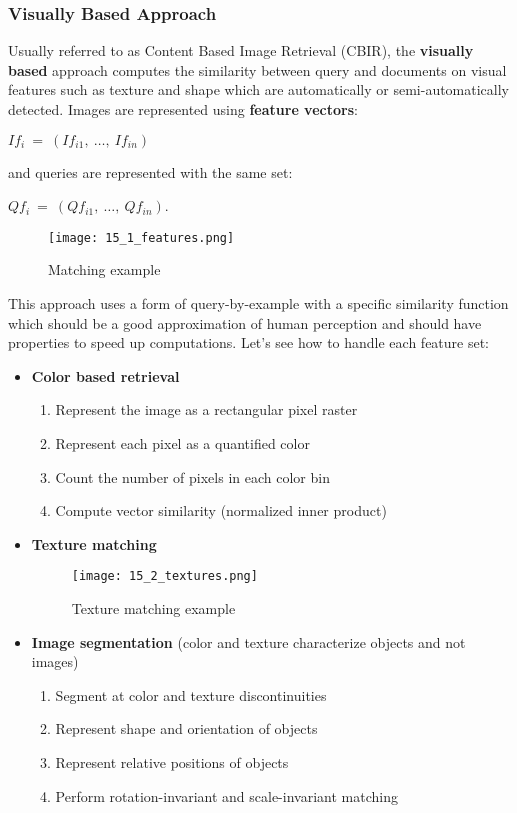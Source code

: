 \documentclass{article}
\begin{document}
\subsubsection{Visually Based Approach}
Usually referred to as Content Based Image Retrieval (CBIR), the \textbf{visually based} approach computes the similarity between query and documents on visual features such as texture and shape which are automatically or semi-automatically detected. Images are represented using \textbf{feature vectors}:
\begin{center}
    $If_i \ = \ (If_{i1}, \ \dots, \ If_{in})$
\end{center}
and queries are represented with the same set:
\begin{center}
    $Qf_i \ = \ (Qf_{i1}, \ \dots, \ Qf_{in})$.
\end{center}
\begin{figure}[H]
    \centering
    \texttt{[image: 15\_1\_features.png]}
    \caption{Matching example}
\end{figure}
This approach uses a form of query-by-example with a specific similarity function which should be a good approximation of human perception and should have properties to speed up computations.
Let's see how to handle each feature set:
\begin{itemize}
    \item \textbf{Color based retrieval}
        \begin{enumerate}
            \item Represent the image as a rectangular pixel raster
            \item Represent each pixel as a quantified color
            \item Count the number of pixels in each color bin
            \item Compute vector similarity (normalized inner product)
        \end{enumerate}
    \item \textbf{Texture matching}
        \begin{figure}[H]
            \centering
            \texttt{[image: 15\_2\_textures.png]}
            \caption{Texture matching example}
        \end{figure}
    \item \textbf{Image segmentation} (color and texture characterize objects and not images)
        \begin{enumerate}
            \item Segment at color and texture discontinuities
            \item Represent shape and orientation of objects
            \item Represent relative positions of objects
            \item Perform rotation-invariant and scale-invariant matching
        \end{enumerate}
\end{itemize}
\end{document}
